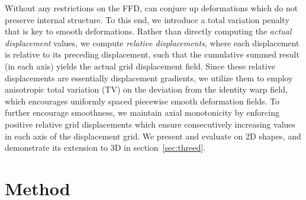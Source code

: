 \documentclass[acmtog,timestamp]{acmart}%
\begin{document}
Without any restrictions on the FFD, \ourmethod{} can conjure up deformations which do not preserve internal structure. 
To this end, we introduce a total variation penalty that is key to 
smooth deformations.
Rather than directly computing the \emph{actual displacement} values, we compute \emph{relative displacements}, where each displacement is relative to its preceding displacement, such that the cumulative summed result (in each axis) yields the actual grid displacement field.
Since these relative displacements are essentially displacement gradients, we utilize them to employ anisotropic total variation (TV) on the deviation from the identity warp field, which encourages uniformly spaced piecewise smooth deformation fields.
To further encourage smoothness, we maintain axial monotonicity by enforcing positive relative grid displacements which ensure consecutively increasing values in each axis of the displacement grid.
We present and evaluate \ourmethod{} on 2D shapes, and demonstrate its extension to 3D in section~\ref{sec:threed}.
\section{Method}
\end{document}
